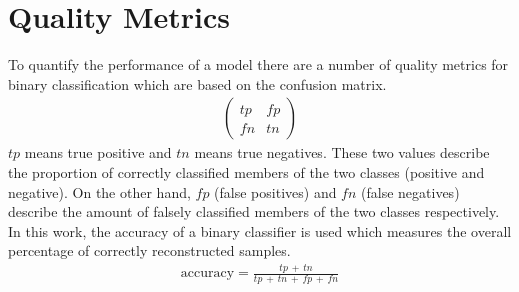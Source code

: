 \section{Quality Metrics}
\label{sec:quality_metrics}
To quantify the performance of a model there are a number of quality metrics for binary classification which are based on the confusion matrix.
\begin{align}
    \begin{pmatrix}
        tp & fp \\
        fn & tn
    \end{pmatrix}
\end{align}
$tp$ means true positive and $tn$ means true negatives. 
These two values describe the proportion of correctly classified members of the two classes (positive and negative).
On the other hand, $fp$ (false positives) and $fn$ (false negatives) describe the amount of falsely classified members of the two classes respectively.
In this work, the accuracy of a binary classifier is used which measures the overall percentage of correctly reconstructed samples.
\begin{align}
    \text{accuracy} = \frac{tp\, +\, tn}{tp\, +\, tn\, +\, fp\, +\, fn}
\end{align}
